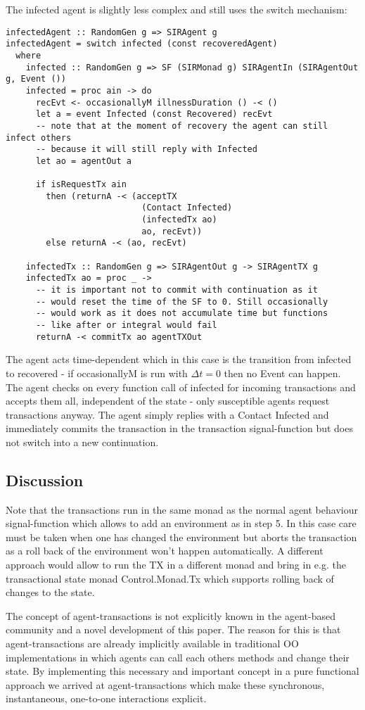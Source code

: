 The infected agent is slightly less complex and still uses the switch mechanism:
\begin{verbatim}
infectedAgent :: RandomGen g => SIRAgent g
infectedAgent = switch infected (const recoveredAgent)
  where
    infected :: RandomGen g => SF (SIRMonad g) SIRAgentIn (SIRAgentOut g, Event ())
    infected = proc ain -> do
      recEvt <- occasionallyM illnessDuration () -< ()
      let a = event Infected (const Recovered) recEvt
      -- note that at the moment of recovery the agent can still infect others
      -- because it will still reply with Infected
      let ao = agentOut a

      if isRequestTx ain 
        then (returnA -< (acceptTX 
                           (Contact Infected)
                           (infectedTx ao)
                           ao, recEvt))
        else returnA -< (ao, recEvt)

    infectedTx :: RandomGen g => SIRAgentOut g -> SIRAgentTX g
    infectedTx ao = proc _ ->
      -- it is important not to commit with continuation as it
      -- would reset the time of the SF to 0. Still occasionally
      -- would work as it does not accumulate time but functions
      -- like after or integral would fail
      returnA -< commitTx ao agentTXOut
\end{verbatim}

The agent acts time-dependent which in this case is the transition from infected to recovered - if occasionallyM is run with $\Delta t = 0$ then no Event can happen. The agent checks on every function call of infected for incoming transactions and accepts them all, independent of the state - only susceptible agents request transactions anyway. The agent simply replies with a Contact Infected and immediately commits the transaction in the transaction signal-function but does not switch into a new continuation.

\subsection{Discussion}
Note that the transactions run in the same monad as the normal agent behaviour signal-function which allows to add an environment as in step 5. In this case care must be taken when one has changed the environment but aborts the transaction as a roll back of the environment won't happen automatically. A different approach would allow to run the TX in a different monad and bring in e.g. the  transactional state monad Control.Monad.Tx which supports rolling back of changes to the state.

The concept of agent-transactions is not explicitly known in the agent-based community and a novel development of this paper. The reason for this is that agent-transactions are already implicitly available in traditional OO implementations in which agents can call each others methods and change their state. By implementing this necessary and important concept in a pure functional approach we arrived at agent-transactions which make these synchronous, instantaneous, one-to-one interactions explicit.